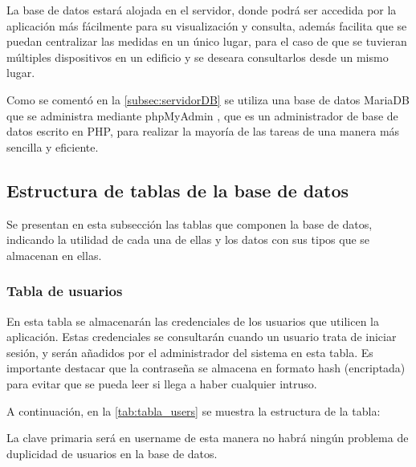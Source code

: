La base de datos estará alojada en el servidor, donde podrá ser accedida por la aplicación más fácilmente para su visualización y consulta, además facilita que se puedan centralizar las medidas en un único lugar, para el caso de que se tuvieran múltiples dispositivos en un edificio y se deseara consultarlos desde un mismo lugar.

Como se comentó en la \autoref{subsec:servidorDB} se utiliza una base de datos MariaDB que se administra mediante phpMyAdmin \cite{noauthor_phpmyadmin_nodate}, que es un administrador de base de datos escrito en PHP, para realizar la mayoría de las tareas de una manera más sencilla y eficiente.

\subsection{Estructura de tablas de la base de datos}
Se presentan en esta subsección las tablas que componen la base de datos, indicando la utilidad de cada una de ellas y los datos con sus tipos que se almacenan en ellas.

\subsubsection{Tabla de usuarios}
En esta tabla se almacenarán las credenciales de los usuarios que utilicen la aplicación. Estas credenciales se consultarán cuando un usuario trata de iniciar sesión, y serán añadidos por el administrador del sistema en esta tabla. Es importante destacar que la contraseña se almacena en formato hash (encriptada) para evitar que se pueda leer si llega a haber cualquier intruso. 

A continuación, en la \autoref{tab:tabla_users} se muestra la estructura de la tabla:
\begin{table}[H]
    \centering
    \caption{Estructura tabla users}
    \label{tab:tabla_users}
    \end{table}
La clave primaria será en username de esta manera no habrá ningún problema de duplicidad de usuarios en la base de datos.

